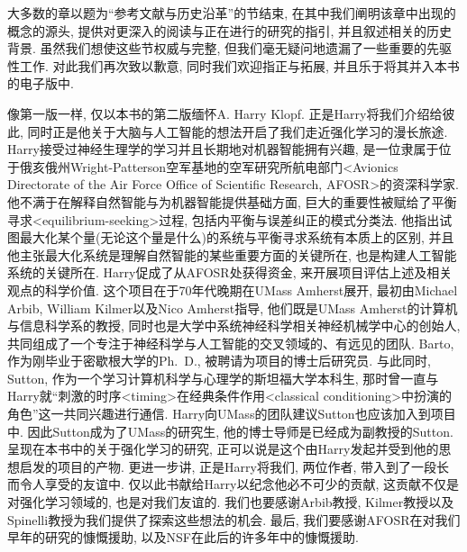 大多数的章以题为``参考文献与历史沿革''的节结束, 在其中我们阐明该章中出现的概念的源头, 提供对更深入的阅读与正在进行的研究的指引, 并且叙述相关的历史背景. 虽然我们想使这些节权威与完整, 但我们毫无疑问地遗漏了一些重要的先驱性工作. 对此我们再次致以歉意, 同时我们欢迎指正与拓展, 并且乐于将其并入本书的电子版中.

像第一版一样, 仅以本书的第二版缅怀A. Harry Klopf. 正是Harry将我们介绍给彼此, 同时正是他关于大脑与人工智能的想法开启了我们走近强化学习的漫长旅途. Harry接受过神经生理学的学习并且长期地对机器智能拥有兴趣, 是一位隶属于位于俄亥俄州Wright-Patterson空军基地的空军研究所航电部门<Avionics Directorate of the Air Force Office of Scientific Research, AFOSR>的资深科学家. 他不满于在解释自然智能与为机器智能提供基础方面, 巨大的重要性被赋给了平衡寻求<equilibrium-seeking>过程, 包括内平衡与误差纠正的模式分类法. 他指出试图最大化某个量(无论这个量是什么)的系统与平衡寻求系统有本质上的区别, 并且他主张最大化系统是理解自然智能的某些重要方面的关键所在, 也是构建人工智能系统的关键所在. Harry促成了从AFOSR处获得资金, 来开展项目评估上述及相关观点的科学价值. 这个项目在于70年代晚期在UMass Amherst展开, 最初由Michael Arbib, William Kilmer以及Nico Amherst指导, 他们既是UMass Amherst的计算机与信息科学系的教授, 同时也是大学中系统神经科学相关神经机械学中心的创始人, 共同组成了一个专注于神经科学与人工智能的交叉领域的、有远见的团队. Barto, 作为刚毕业于密歇根大学的Ph.~D., 被聘请为项目的博士后研究员. 与此同时, Sutton, 作为一个学习计算机科学与心理学的斯坦福大学本科生, 那时曾一直与Harry就``刺激的时序<timing>在经典条件作用<classical conditioning>中扮演的角色''这一共同兴趣进行通信. Harry向UMass的团队建议Sutton也应该加入到项目中. 因此Sutton成为了UMass的研究生, 他的博士导师是已经成为副教授的Sutton. 呈现在本书中的关于强化学习的研究, 正可以说是这个由Harry发起并受到他的思想启发的项目的产物. 更进一步讲, 正是Harry将我们, 两位作者, 带入到了一段长而令人享受的友谊中. 仅以此书献给Harry以纪念他必不可少的贡献, 这贡献不仅是对强化学习领域的, 也是对我们友谊的. 我们也要感谢Arbib教授, Kilmer教授以及Spinelli教授为我们提供了探索这些想法的机会. 最后, 我们要感谢AFOSR在对我们早年的研究的慷慨援助, 以及NSF在此后的许多年中的慷慨援助.

